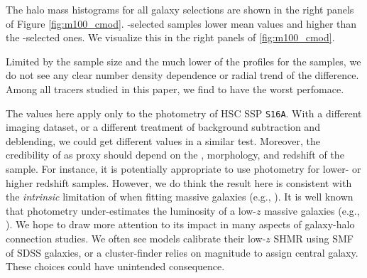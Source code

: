 \documentclass[a4paper,fleqn,usenatbib]{mnras}
\begin{document}
            The halo mass histograms for all galaxy selections are shown in the right panels of Figure \ref{fig:m100_cmod}.  \mcmodel{}-selected samples lower mean \mvir{} values and higher \sigmh{}
            than the -selected ones. 
            We visualize this in the right panels of \ref{fig:m100_cmod}.

       Limited by the sample size and the much lower \snratio{} of the \dsigma{} profiles
            for the \mcmodel{} samples, we do not see any clear number density dependence or radial
            trend of the difference. Among all tracers studied in this paper, we find \mcmodel{} to have the worst perfomace. 
            

        The \sigmh{} values here apply only to the \cmodel{} photometry of HSC SSP
            \texttt{S16A}. With a different imaging dataset, or a different treatment of background
            subtraction and deblending, we could get different \sigmh{} values in a similar test.
            Moreover, the credibility of \mcmodel{} as \mvir{} proxy should depend on the \mstar{},
            morphology, and redshift of the sample. For instance, it is potentially appropriate
            to use \cmodel{} photometry for lower-\mstar{} or higher redshift samples.
            However, we do think the result here is consistent with the \emph{intrinsic}
            limitation of \cmodel{} when fitting massive galaxies (e.g., \addref{}).
            It is well known that \cmodel{} photometry under-estimates the luminosity of a low-$z$
            massive galaxies (e.g., \addref{}).
            We hope to draw more attention to its impact in many aspects of galaxy-halo connection
            studies. We often see models calibrate their low-$z$ SHMR using \cmodel{} SMF of SDSS
            galaxies, or a cluster-finder relies on \cmodel{} magnitude to assign central galaxy.
            These choices could have unintended consequence.

  
\end{document}
